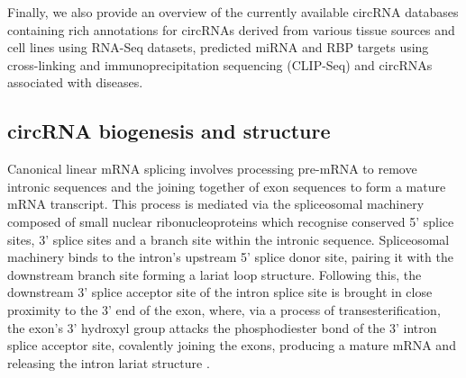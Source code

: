 Finally, we also provide an overview of the currently available circRNA databases containing rich annotations for circRNAs derived from various tissue sources and cell lines using RNA-Seq datasets, predicted miRNA and RBP targets using cross-linking and immunoprecipitation sequencing (CLIP-Seq) and circRNAs associated with diseases. 

\subsection{circRNA biogenesis and structure}
Canonical linear mRNA splicing involves processing pre-mRNA to remove intronic sequences and the joining together of exon sequences to form a mature mRNA transcript. This process is mediated via the spliceosomal machinery composed of small nuclear ribonucleoproteins which recognise conserved 5' splice sites,  3' splice sites and a branch site within the intronic sequence. Spliceosomal machinery binds to the intron's upstream 5' splice donor site, pairing it with the downstream branch site forming a lariat loop structure. Following this, the downstream 3' splice acceptor site of the intron splice site is brought in close proximity to the 3' end of the exon, where, via a process of transesterification, the exon's 3' hydroxyl group attacks the phosphodiester bond of the 3' intron splice acceptor site, covalently joining the exons, producing a mature mRNA and releasing the intron lariat structure \cite{BibEntry2019Dec}. \par


